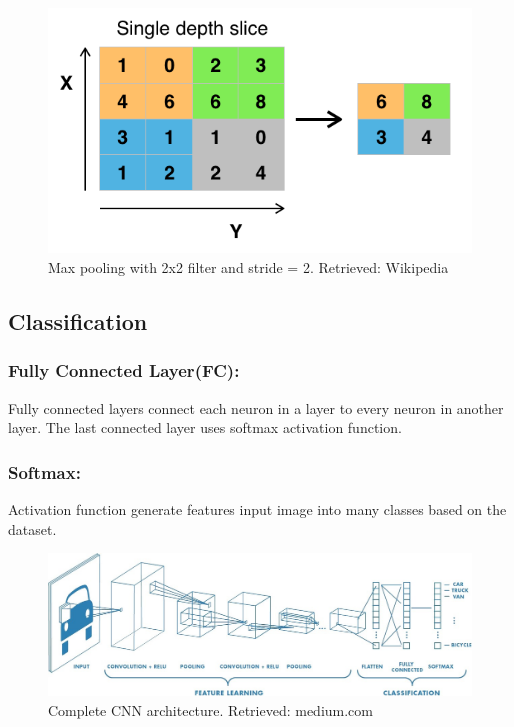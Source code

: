 \documentclass[12pt]{report}
\begin{document}
\begin{figure}[h]
    \centering
    \includegraphics[width=.8\textwidth]{./images/pool.png}
    \caption{Max pooling with 2x2 filter and stride = 2. Retrieved: Wikipedia}
    \label{fig:pool}
\end{figure}

\subsection{Classification}
\subsubsection{Fully Connected Layer(FC):}
Fully connected layers connect each neuron in a layer to every neuron 
in another layer. The last connected layer uses softmax activation function.
\subsubsection{Softmax:}
Activation function generate features input image into many 
classes based on the dataset.  

\bigbreak
\bigbreak


\begin{figure} [h]
    \centering
    \includegraphics[width=\textwidth]{./images/c_cnn.jpeg}
    
    \caption{Complete CNN architecture. Retrieved: medium.com}
    \label{fig:c_cnn}
\end{figure}
\end{document}
